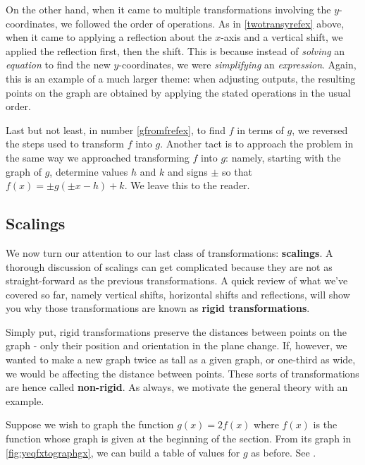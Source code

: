 On the other hand, when it came to multiple transformations involving the $y$-coordinates, we followed the order of operations. As in \ref{twotransyrefex} above, when it came to applying a reflection about the $x$-axis and a vertical shift, we applied the reflection first, then the shift.  This is because instead of \textit{solving} an \textit{equation} to find the new $y$-coordinates, we were \textit{simplifying }an \textit{expression}.  Again, this is an example of a much larger theme:  when adjusting outputs, the resulting points on the graph are obtained by applying the stated operations in the usual order.

Last but not least, in number \ref{gfromfrefex}, to find $f$ in terms of $g$, we reversed the steps used to transform $f$ into $g$.  Another tact is to approach the problem in the same way we approached transforming $f$ into $g$: namely, starting with the graph of $g$, determine values $h$ and $k$ and signs $\pm$ so that $f(x) = \pm g(\pm x - h) + k$.  We leave this to the reader.

\subsection{Scalings}
\label{Scaling}

We now turn our attention to our last class of transformations: \textbf{scalings}.  A thorough discussion of scalings can get complicated because they are not as straight-forward as the previous transformations.  A quick review of what we've covered so far, namely vertical shifts, horizontal shifts and reflections, will show you why those transformations are known as \textbf{rigid transformations}.  

Simply put, rigid transformations preserve the distances between points on the graph -  only their position and orientation in the plane change.  If, however, we wanted to make a new graph twice as tall as a given graph, or one-third as wide, we would be affecting the distance between points. These sorts of transformations are hence called \textbf{non-rigid}.  As always, we motivate the general theory with an example.

Suppose we wish to graph the function $g(x) =2 f(x)$ where $f(x)$ is the function whose graph is given at the beginning of the section. From its graph in \autoref{fig:yeqfxtographgx}, we can build a table of values for $g$ as before. See .


